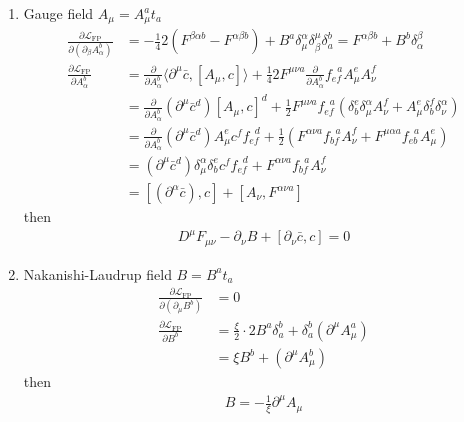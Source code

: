 \documentclass[10pt,a4paper]{article}
\theoremstyle{definition}
\begin{document}
\begin{enumerate}
\begin{itemize}
\end{itemize}

\begin{enumerate}
\item Gauge field $A_\mu = A^a_\mu t_a$
\begin{align}
\frac{\partial\mathcal{L}_\text{FP}}{\partial (\partial_\beta A^b_\alpha)}
&=-\frac{1}{4}2(F^{\beta\alpha b}-F^{\alpha\beta b}) +B^a\delta_\mu^\alpha\delta^\mu_\beta\delta^b_a
=F^{\alpha\beta b}+B^b\delta_\alpha^\beta\\
%
\frac{\partial\mathcal{L}_\text{FP}}{\partial A^b_\alpha}
&=\frac{\partial}{\partial A^b_\alpha}\langle\partial^\mu\bar{c},[A_\mu,c]\rangle
+\frac{1}{4}2F^{\mu\nu a}\frac{\partial}{\partial A^b_\alpha}f_{ef}^{\;\;a}A^e_\mu A^f_\nu\\
&=\frac{\partial}{\partial A^b_\alpha}(\partial^\mu\bar{c}^d)[A_\mu,c]^d+\frac{1}{2}F^{\mu\nu a}f_{ef}^{\;\;a}(\delta^e_b\delta^\alpha_\mu A^f_\nu+A^e_\mu\delta^f_b\delta^\alpha_\nu)\\
&=\frac{\partial}{\partial A^b_\alpha}(\partial^\mu\bar{c}^d)A_\mu^ec^f f_{ef}^{\;\;d}+\frac{1}{2}(F^{\alpha\nu a}f_{bf}^{\;\;a}A^f_\nu+F^{\mu\alpha a}f_{eb}^{\;\;a}A^e_\mu)\\
&=(\partial^\mu\bar{c}^d)\delta^\alpha_\mu\delta^e_b c^f f_{ef}^{\;\;d}+F^{\alpha\nu a}f_{bf}^{\;\;a}A^f_\nu\\
&=[(\partial^\alpha\bar{c}),c]+[A_\nu,F^{\alpha\nu a}]
\end{align}
then
\begin{align}
\boxed{D^\mu F_{\mu\nu}-\partial_\nu B+[\partial_\nu\bar{c},c]=0}
\end{align}
\item Nakanishi-Laudrup field $B=B^a t_a$
\begin{align}
\frac{\partial\mathcal{L}_\text{FP}}{\partial (\partial_\mu B^b)}&=0\\
\frac{\partial\mathcal{L}_\text{FP}}{\partial B^b}
&=\frac{\xi}{2}\cdot2B^a\delta^b_a+\delta^b_a(\partial^\mu A^a_\mu)\\
&=\xi B^b+(\partial^\mu A^b_\mu)
\end{align}
then
\begin{align}
\boxed{B=-\frac{1}{\xi}\partial^\mu A_\mu}
\end{align}


\end{enumerate}
\end{enumerate}
\end{document}
